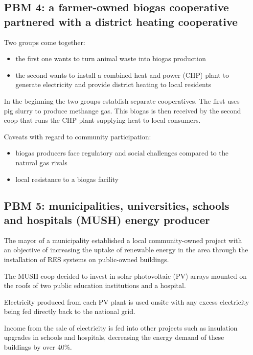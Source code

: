 \subsection{PBM 4: a farmer-owned biogas cooperative partnered with a
district heating cooperative}

Two groups come together:

\begin{itemize}
	\item the first one wants to turn animal waste into biogas production
	\item the second wants to install a combined heat and power (CHP)
	plant to generate electricity and provide district heating to local
	residents
\end{itemize}

In the beginning the two groups establish separate cooperatives. The first uses
pig slurry to produce methange gas. This biogas is then received by the second
coop that runs the CHP plant supplying heat to local consumers.

Caveats with regard to community participation:
\begin{itemize}
	\item biogas producers face regulatory and social challenges compared
	to the natural gas rivals
	\item local resistance to a biogas facility
\end{itemize}

\subsection{PBM 5: municipalities, universities, schools and hospitals
(MUSH) energy producer}

The mayor of a municipality established a local community-owned project with an
objective of increasing the uptake of renewable energy in the area through the
installation of RES systems on public-owned buildings.

The MUSH coop decided to invest in solar photovoltaic (PV) arrays mounted on
the roofs of two public education institutions and a hospital.

Electricity produced from each PV plant is used onsite with any excess
electricity being fed directly back to the national grid.

Income from the sale of electricity is fed into other projects such as
insulation upgrades in schools and hospitals, decreasing the energy demand of
these buildings by over 40\%.

